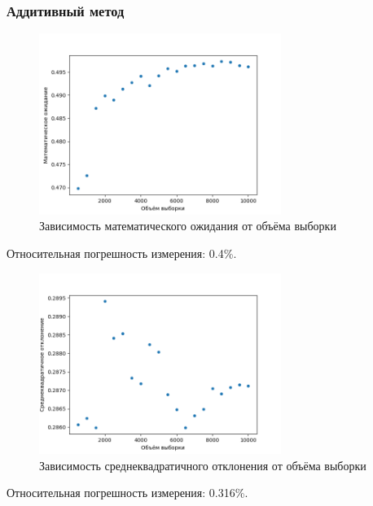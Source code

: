 \documentclass[bachelor, och, labwork]{SCWorks}
\begin{document}
\subsubsection{Аддитивный метод}
\begin{figure}[H]
  \centering
  \includegraphics[width=0.7\textwidth]{add_me.png}
  \caption{Зависимость математического ожидания от объёма выборки}
\end{figure}
Относительная погрешность измерения: 0.4\%.

\begin{figure}[H]
  \centering
  \includegraphics[width=0.7\textwidth]{add_st.png}
  \caption{Зависимость среднеквадратичного отклонения от объёма выборки}
\end{figure}
Относительная погрешность измерения: 0.316\%.
\end{document}
